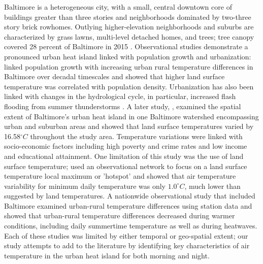 \documentclass[draft,linenumbers]{agujournal}
\begin{document}
Baltimore is a heterogeneous city, with a small, central downtown core of buildings greater than three stories and  neighborhoods dominated by two-three story brick rowhomes. Outlying higher-elevation neighborhoods and suburbs are characterized by grass lawns, multi-level detached homes, and trees; tree canopy covered 28 percent of Baltimore in 2015 \cite{grove2011urban}. 
Observational studies demonstrate a pronounced urban heat island linked with population growth and urbanization: \cite{brazel2000tale} linked population growth with increasing urban rural temperature differences in Baltimore over decadal timescales and showed that higher land surface temperature was correlated with population density. 
Urbanization has also been linked with changes in the hydrological cycle, in particular,    %
increased flash flooding from summer thunderstorms \citep{ntelekos2007climatological}.   
 A later study,
\cite{Huang20111753}, examined the spatial extent of Baltimore's urban heat island in one Baltimore watershed encompassing urban and suburban areas and showed that land surface temperatures varied by 16.58$^\circ C$ throughout the study area. Temperature variations were linked with socio-economic factors including high poverty and crime rates and low income and educational attainment. One limitation of this study was the use of land surface temperature; \cite{scott2017intraurban} used an observational network to focus on a land surface temperature local maximum or 'hotspot' and showed that air temperature variability for minimum daily temperature was only $1.0^\circ C$, much lower than suggested by land temperatures. 
A nationwide observational study that included Baltimore \citep{scott2018reduced} examined urban-rural temperature differences using station data and showed that urban-rural temperature differences decreased during warmer conditions, including daily summertime temperature as well as during heatwaves.  Each of these studies was limited by either temporal or geo-spatial extent; our study attempts to add to the literature by identifying key characteristics of air temperature in the urban heat island for both morning and night. 
\end{document}

